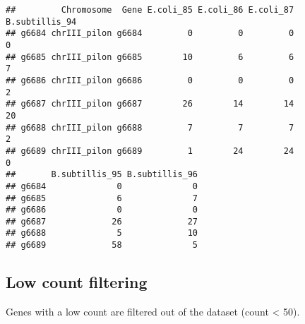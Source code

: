 \documentclass[]{article}
\newenvironment{Shaded}{\begin{snugshade}}{\end{snugshade}}
\newcommand{\KeywordTok}[1]{\textcolor[rgb]{0.13,0.29,0.53}{\textbf{#1}}}
\newcommand{\StringTok}[1]{\textcolor[rgb]{0.31,0.60,0.02}{#1}}
\newcommand{\CommentTok}[1]{\textcolor[rgb]{0.56,0.35,0.01}{\textit{#1}}}
\newcommand{\OperatorTok}[1]{\textcolor[rgb]{0.81,0.36,0.00}{\textbf{#1}}}
\newcommand{\NormalTok}[1]{#1}
\begin{document}
\begin{Shaded}
\end{Shaded}

\begin{verbatim}
##         Chromosome  Gene E.coli_85 E.coli_86 E.coli_87 B.subtillis_94
## g6684 chrIII_pilon g6684         0         0         0              0
## g6685 chrIII_pilon g6685        10         6         6              7
## g6686 chrIII_pilon g6686         0         0         0              2
## g6687 chrIII_pilon g6687        26        14        14             20
## g6688 chrIII_pilon g6688         7         7         7              2
## g6689 chrIII_pilon g6689         1        24        24              0
##       B.subtillis_95 B.subtillis_96
## g6684              0              0
## g6685              6              7
## g6686              0              0
## g6687             26             27
## g6688              5             10
## g6689             58              5
\end{verbatim}

\subsection{Low count filtering}\label{low-count-filtering}

Genes with a low count are filtered out of the dataset (count
\textless{} 50).
\end{document}
